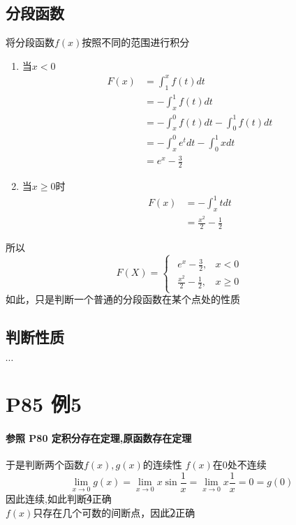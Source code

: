 \documentclass[a4paper]{ctexart}
\begin{document}
\begin{multicols}{2}
    \subsection{分段函数}
    将分段函数$f(x)$按照不同的范围进行积分\\
    \begin{enumerate}
        \item 当$x<0$\\
        $$
        \begin{array}{ll}
        F(x) & = \int_{1}^{x}{f(t)dt}\\
            &   = -\int_{x}^{1}{f(t)dt}\\
            &   = -\int_{x}^{0}{f(t)dt} -\int_{0}^{1}{f(t)dt}   \\
            &   = -\int_{x}^{0}{e^tdt} - \int_{0}^{1}{xdt}\\
            &   = e^x - \frac{3}{2}
        \end{array}
        $$
        \item 当$x \ge 0$时\\
        $$
        \begin{array}{ll}
        F(x)    & =- \int_{x}^{1}{tdt} \\
                & =\frac{x^2}{2} - \frac{1}{2}
        \end{array}
        $$
    \end{enumerate}
    所以
    $$
    F(X) = 
    \begin{cases}
        \begin{array}{ll}
        e^x - \frac{3}{2},          &    x<0\\
        \frac{x^2}{2} - \frac{1}{2},&    x\ge 0
        \end{array}
    \end{cases}
    $$
    如此，只是判断一个普通的分段函数在某个点处的性质
    \subsection{判断性质}
    $\cdots$

    \section{P85 例5}
    \paragraph{参照 P80 定积分存在定理,原函数存在定理}
    于是判断两个函数$f(x),g(x)$的连续性
    $f(x)$在0处不连续
    $$
    \lim_{x \rightarrow 0}{g(x)}
    = 
    \lim_{x \rightarrow 0}{x\sin{\frac{1}{x}}}
    =
    \lim_{x \rightarrow 0}{x\frac{1}{x}} = 0 = g(0)
    $$
    因此连续,如此判断\textcircled{4}正确\\
    $f(x)$只存在几个可数的间断点，因此\textcircled{2}正确


\end{multicols}
\end{document}
